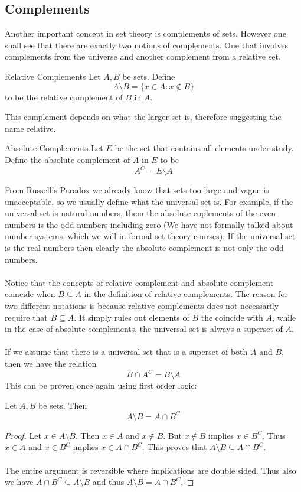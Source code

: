 \subsection{Complements}
Another important concept in set theory is complements of sets. However one shall see that there are exactly two notions of complements. One that involves complements from the universe and another complement from a relative set. 

\begin{defn}{Relative Complements}{} Let $A,B$ be sets. Define $$A\setminus B=\{x\in A:x\notin B\}$$ to be the relative complement of $B$ in $A$. 
\end{defn}

This complement depends on what the larger set is, therefore suggesting the name relative. 

\begin{defn}{Absolute Complements}{} Let $E$ be the set that contains all elements under study. Define the absolute complement of $A$ in $E$ to be $$A^C=E\setminus A$$
\end{defn}

From Russell's Paradox we already know that sets too large and vague is unacceptable, so we usually define what the universal set is. For example, if the universal set is natural numbers, them the absolute coplements of the even numbers is the odd numbers including zero (We have not formally talked about number systems, which we will in formal set theory courses). If the universal set is the real numbers then clearly the absolute complement is not only the odd numbers. \\~\\

Notice that the concepts of relative complement and absolute complement coincide when $B\subseteq A$ in the definition of relative complements. The reason for two different notations is because relative complements does not necessarily require that $B\subseteq A$. It simply rules out elements of $B$ the coincide with $A$, while in the case of absolute complements, the universal set is always a superset of $A$. \\~\\

If we assume that there is a universal set that is a superset of both $A$ and $B$, then we have the relation $$B\cap A^C=B\setminus A$$ This can be proven once again using first order logic:

\begin{prp}{}{} Let $A,B$ be sets. Then $$A\setminus B=A\cap B^C$$\tcbline
\begin{proof} Let $x\in A\setminus B$. Then $x\in A$ and $x\notin B$. But $x\notin B$ implies $x\in B^C$. Thus $x\in A$ and $x\in B^C$ implies $x\in A\cap B^C$. This proves that $A\setminus B\subseteq A\cap B^C$. \\~\\
The entire argument is reversible where implications are double sided. Thus also we have $A\cap B^C\subseteq A\setminus B$ and thus $A\setminus B=A\cap B^C$. 
\end{proof}
\end{prp}

